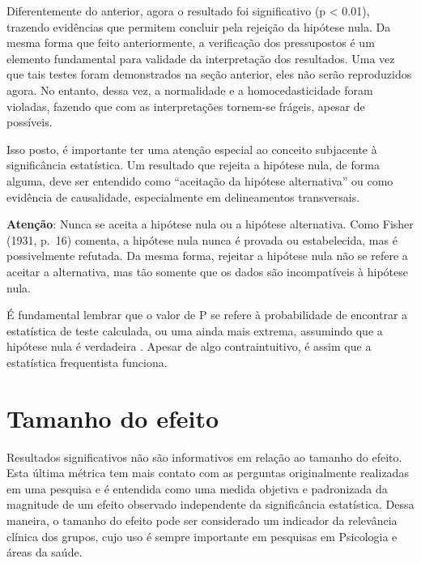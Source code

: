 \documentclass[
]{book}
\newenvironment{warning}{
  \definecolor{shadecolor}{rgb}{0, 0, 0}  %
  \color{white}
  \begin{shaded}}
 {\end{shaded}}
\begin{document}
Diferentemente do anterior, agora o resultado foi significativo (p \textless{} 0.01), trazendo evidências que permitem concluir pela rejeição da hipótese nula. Da mesma forma que feito anteriormente, a verificação dos pressupostos é um elemento fundamental para validade da interpretação dos resultados. Uma vez que tais testes foram demonstrados na seção anterior, eles não serão reproduzidos agora. No entanto, dessa vez, a normalidade e a homocedasticidade foram violadas, fazendo que com as interpretações tornem-se frágeis, apesar de possíveis.

Isso posto, é importante ter uma atenção especial ao conceito subjacente à significância estatística. Um resultado que rejeita a hipótese nula, de forma alguma, deve ser entendido como ``aceitação da hipótese alternativa'' ou como evidência de causalidade, especialmente em delineamentos transversais.

\begin{warning}

\textbf{Atenção}: Nunca se aceita a hipótese nula ou a hipótese alternativa. Como Fisher (1931, p.~16) comenta, a hipótese nula nunca é provada ou estabelecida, mas é possivelmente refutada. Da mesma forma, rejeitar a hipótese nula não se refere a aceitar a alternativa, mas tão somente que os dados são incompatíveis à hipótese nula.

\end{warning}

É fundamental lembrar que o valor de P se refere à probabilidade de encontrar a estatística de teste calculada, ou uma ainda mais extrema, assumindo que a hipótese nula é verdadeira \citep{Wasserstein2016}. Apesar de algo contraintuitivo, é assim que a estatística frequentista funciona.

\hypertarget{tamanho-do-efeito-1}{%
\section{Tamanho do efeito}\label{tamanho-do-efeito-1}}

Resultados significativos não são informativos em relação ao tamanho do efeito. Esta última métrica tem mais contato com as perguntas originalmente realizadas em uma pesquisa e é entendida como uma medida objetiva e padronizada da magnitude de um efeito observado independente da significância estatística. Dessa maneira, o tamanho do efeito pode ser considerado um indicador da relevância clínica dos grupos, cujo uso é sempre importante em pesquisas em Psicologia e áreas da saúde.
\end{document}
